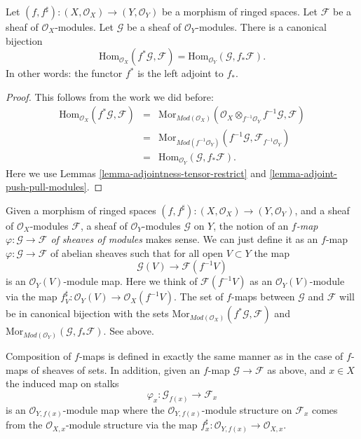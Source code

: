 \begin{lemma}
\label{lemma-adjoint-pullback-pushforward-modules}
Let $(f, f^\sharp) : (X, \mathcal{O}_X) \to (Y, \mathcal{O}_Y)$
be a morphism of ringed spaces.
Let $\mathcal{F}$ be a sheaf of $\mathcal{O}_X$-modules.
Let $\mathcal{G}$ be a sheaf of $\mathcal{O}_Y$-modules.
There is a canonical bijection
$$
\text{Hom}_{\mathcal{O}_X}(f^*\mathcal{G}, \mathcal{F})
=
\text{Hom}_{\mathcal{O}_Y}(\mathcal{G}, f_*\mathcal{F}).
$$
In other words: the functor $f^*$ is the left adjoint to
$f_*$.
\end{lemma}

\begin{proof}
This follows from the work we did before:
\begin{eqnarray*}
\text{Hom}_{\mathcal{O}_X}(f^*\mathcal{G}, \mathcal{F})
& = &
\text{Mor}_{\textit{Mod}(\mathcal{O}_X)}(
\mathcal{O}_X \otimes_{f^{-1}\mathcal{O}_Y} f^{-1}\mathcal{G}, \mathcal{F}) \\
& = &
\text{Mor}_{\textit{Mod}(f^{-1}\mathcal{O}_Y)}(
f^{-1}\mathcal{G}, \mathcal{F}_{f^{-1}\mathcal{O}_Y}) \\
& = &
\text{Hom}_{\mathcal{O}_Y}(\mathcal{G}, f_*\mathcal{F}).
\end{eqnarray*}
Here we use Lemmas \ref{lemma-adjointness-tensor-restrict}
and \ref{lemma-adjoint-push-pull-modules}.
\end{proof}

\noindent
Given a morphism of ringed spaces
$(f, f^\sharp) : (X, \mathcal{O}_X) \to (Y, \mathcal{O}_Y)$,
and a sheaf of $\mathcal{O}_X$-modules $\mathcal{F}$,
a sheaf of $\mathcal{O}_Y$-modules $\mathcal{G}$ on $Y$,
the notion of an {\it $f$-map $\varphi : \mathcal{G} \to \mathcal{F}$
of sheaves of modules} makes sense. We can just define
it as an $f$-map $\varphi : \mathcal{G} \to \mathcal{F}$
of abelian sheaves such that for all open $V \subset Y$ the map
$$
\mathcal{G}(V) \longrightarrow \mathcal{F}(f^{-1}V)
$$
is an $\mathcal{O}_Y(V)$-module map. Here we think of
$\mathcal{F}(f^{-1}V)$ as an $\mathcal{O}_Y(V)$-module
via the map $f^\sharp_V : \mathcal{O}_Y(V) \to \mathcal{O}_X(f^{-1}V)$.
The set of $f$-maps between
$\mathcal{G}$ and $\mathcal{F}$ will be in canonical bijection
with the sets
$\text{Mor}_{\textit{Mod}(\mathcal{O}_X)}(f^*\mathcal{G}, \mathcal{F})$
and
$\text{Mor}_{\textit{Mod}(\mathcal{O}_Y)}(\mathcal{G}, f_*\mathcal{F})$.
See above.

\medskip\noindent
Composition of $f$-maps is defined in exactly the
same manner as in the case of $f$-maps of sheaves of
sets. In addition, given an $f$-map $\mathcal{G} \to \mathcal{F}$
as above, and $x \in X$ the induced map on stalks
$$
\varphi_x : \mathcal{G}_{f(x)} \longrightarrow \mathcal{F}_x
$$
is an $\mathcal{O}_{Y,f(x)}$-module map where the
$\mathcal{O}_{Y,f(x)}$-module structure on $\mathcal{F}_x$
comes from the $\mathcal{O}_{X,x}$-module structure via
the map $f^\sharp_x : \mathcal{O}_{Y,f(x)} \to \mathcal{O}_{X,x}$.











